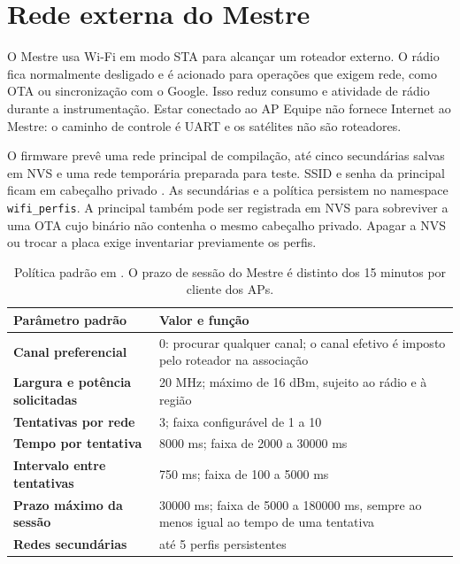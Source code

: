 \section{Rede externa do Mestre}\label{sec:wifi-mestre}
O Mestre usa Wi-Fi em modo STA para alcançar um roteador externo. O rádio fica normalmente desligado e é acionado para operações que exigem rede, como OTA ou sincronização com o Google. Isso reduz consumo e atividade de rádio durante a instrumentação. Estar conectado ao AP Equipe não fornece Internet ao Mestre: o caminho de controle é UART e os satélites não são roteadores.

O firmware prevê uma rede principal de compilação, até cinco secundárias salvas em NVS e uma rede temporária preparada para teste. SSID e senha da principal ficam em cabeçalho privado . As secundárias e a política persistem no namespace \texttt{wifi\_perfis}. A principal também pode ser registrada em NVS para sobreviver a uma OTA cujo binário não contenha o mesmo cabeçalho privado. Apagar a NVS ou trocar a placa exige inventariar previamente os perfis.

\begin{table}[htbp]\centering\small
\begin{tabularx}{\textwidth}{>{\bfseries}p{5.5cm}X}
\toprule
Parâmetro padrão & Valor e função\\
\midrule
Canal preferencial & 0: procurar qualquer canal; o canal efetivo é imposto pelo roteador na associação\\
Largura e potência solicitadas & 20 MHz; máximo de 16 dBm, sujeito ao rádio e à região\\
Tentativas por rede & 3; faixa configurável de 1 a 10\\
Tempo por tentativa & 8000 ms; faixa de 2000 a 30000 ms\\
Intervalo entre tentativas & 750 ms; faixa de 100 a 5000 ms\\
Prazo máximo da sessão & 30000 ms; faixa de 5000 a 180000 ms, sempre ao menos igual ao tempo de uma tentativa\\
Redes secundárias & até 5 perfis persistentes\\
\bottomrule
\end{tabularx}
\caption{Política padrão em . O prazo de sessão do Mestre é distinto dos 15 minutos por cliente dos APs.}\label{tab:wifi-mestre}
\end{table}

